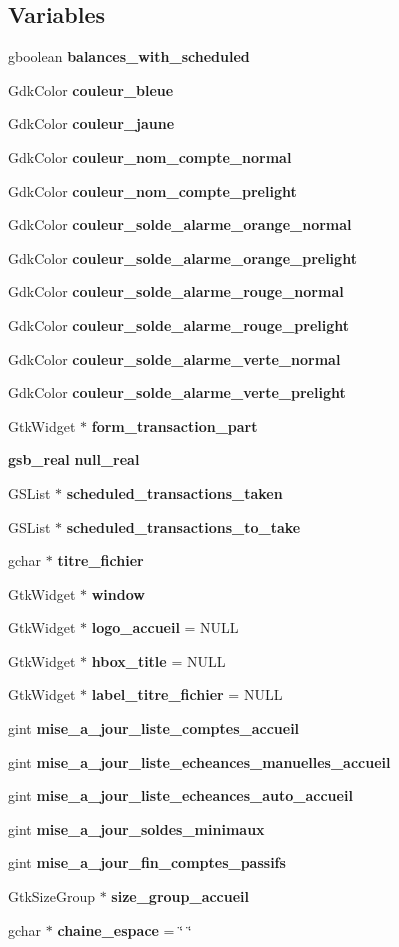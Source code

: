 \subsection*{Variables}
\begin{DoxyCompactItemize}
\item 
gboolean {\bf balances\_\-with\_\-scheduled}
\item 
GdkColor {\bf couleur\_\-bleue}
\item 
GdkColor {\bf couleur\_\-jaune}
\item 
GdkColor {\bf couleur\_\-nom\_\-compte\_\-normal}
\item 
GdkColor {\bf couleur\_\-nom\_\-compte\_\-prelight}
\item 
GdkColor {\bf couleur\_\-solde\_\-alarme\_\-orange\_\-normal}
\item 
GdkColor {\bf couleur\_\-solde\_\-alarme\_\-orange\_\-prelight}
\item 
GdkColor {\bf couleur\_\-solde\_\-alarme\_\-rouge\_\-normal}
\item 
GdkColor {\bf couleur\_\-solde\_\-alarme\_\-rouge\_\-prelight}
\item 
GdkColor {\bf couleur\_\-solde\_\-alarme\_\-verte\_\-normal}
\item 
GdkColor {\bf couleur\_\-solde\_\-alarme\_\-verte\_\-prelight}
\item 
GtkWidget $\ast$ {\bf form\_\-transaction\_\-part}
\item 
{\bf gsb\_\-real} {\bf null\_\-real}
\item 
GSList $\ast$ {\bf scheduled\_\-transactions\_\-taken}
\item 
GSList $\ast$ {\bf scheduled\_\-transactions\_\-to\_\-take}
\item 
gchar $\ast$ {\bf titre\_\-fichier}
\item 
GtkWidget $\ast$ {\bf window}
\item 
GtkWidget $\ast$ {\bf logo\_\-accueil} = NULL
\item 
GtkWidget $\ast$ {\bf hbox\_\-title} = NULL
\item 
GtkWidget $\ast$ {\bf label\_\-titre\_\-fichier} = NULL
\item 
gint {\bf mise\_\-a\_\-jour\_\-liste\_\-comptes\_\-accueil}
\item 
gint {\bf mise\_\-a\_\-jour\_\-liste\_\-echeances\_\-manuelles\_\-accueil}
\item 
gint {\bf mise\_\-a\_\-jour\_\-liste\_\-echeances\_\-auto\_\-accueil}
\item 
gint {\bf mise\_\-a\_\-jour\_\-soldes\_\-minimaux}
\item 
gint {\bf mise\_\-a\_\-jour\_\-fin\_\-comptes\_\-passifs}
\item 
GtkSizeGroup $\ast$ {\bf size\_\-group\_\-accueil}
\item 
gchar $\ast$ {\bf chaine\_\-espace} = \char`\"{} \char`\"{}
\end{DoxyCompactItemize}


